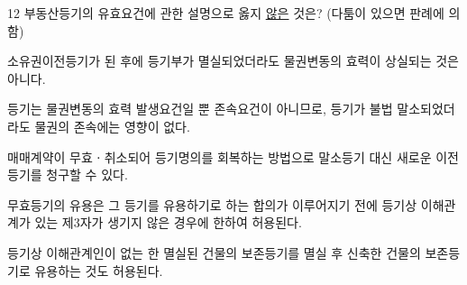 \begin{question}{12}
부동산등기의 유효요건에 관한 설명으로 옳지 \uline{않은} 것은? (다툼이 있으면 판례에 의함)
\begin{choices}
  \item 소유권이전등기가 된 후에 등기부가 멸실되었더라도 물권변동의 효력이 상실되는 것은 아니다.
  \item 등기는 물권변동의 효력 발생요건일 뿐 존속요건이 아니므로, 등기가 불법 말소되었더라도 물권의 존속에는 영향이 없다.
  \item 매매계약이 무효ㆍ취소되어 등기명의를 회복하는 방법으로 말소등기 대신 새로운 이전등기를 청구할 수 있다.
  \item 무효등기의 유용은 그 등기를 유용하기로 하는 합의가 이루어지기 전에 등기상 이해관계가 있는 제3자가 생기지 않은 경우에 한하여 허용된다.
  \item 등기상 이해관계인이 없는 한 멸실된 건물의 보존등기를 멸실 후 신축한 건물의 보존등기로 유용하는 것도 허용된다.
\end{choices}
\end{question}

